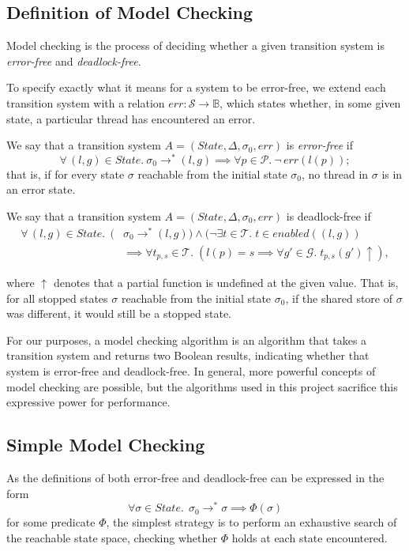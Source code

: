 \documentclass[12pt,a4paper,twoside,openright]{report}
\begin{document}
\subsection{Definition of Model Checking}
Model checking is the process of deciding
whether a
given transition system is \emph{error-free} and
\emph{deadlock-free}.

To specify exactly what it means for a system to
be error-free, we extend each transition system
with a relation
$\textit{err} : \mathcal{S} \to \mathbb{B}$, which states
whether, in some given state, a particular
thread has encountered an error.

We say that a transition system
$A = (\textit{State}, \Delta, \sigma_0, \textit{err})$
is
\emph{error-free} if
\[
	\forall\, (l, g) \in \textit{State}. \ \sigma_0 \longrightarrow^* (l, g)
	\implies \forall p \in \mathcal{P}.\ \neg\,\textit{err}(l(p));
\]
that is, if for every state $\sigma$ reachable from the initial state
$\sigma_0$, no thread in $\sigma$ is in an error state.

We say that a transition system
$A = (\textit{State}, \Delta, \sigma_0, \textit{err})$
is deadlock-free if
\begin{align*}
	\forall\, (l, g) \in \textit{State}. \;\, (&\sigma_0
	 \longrightarrow^* (l, g))
	\wedge (\neg \exists t \in \mathcal{T}.\;
	t \in \textit{enabled}((l, g)) \\
	&\implies \forall t_{p,s} \in \mathcal{T}.\;
	(l(p) = s \implies \forall g' \in \mathcal{G}. \;
		t_{p,s}(g')\!\uparrow),
\end{align*}

where $\uparrow$ denotes that a partial function is
undefined at the given value.
That is, for all stopped states $\sigma$ reachable from
the initial state $\sigma_0$, if the shared store of
$\sigma$ was different, it would still be a stopped state.

For our purposes, a model checking algorithm is an
algorithm that takes a transition system and returns
two Boolean results, indicating whether that system
is error-free and deadlock-free. In general, more
powerful concepts of model checking are possible,
but the algorithms used in this project sacrifice
this expressive power for performance.

\subsection{Simple Model Checking} \label{sec:simple-model-checking}
As the definitions of both error-free and deadlock-free
can be expressed in the form
\[
	\forall \sigma \in \textit{State}.\;\, \sigma_0 \longrightarrow^* \sigma
	\implies \Phi (\sigma)
\]
for some predicate $\Phi$, the simplest strategy is to
perform an exhaustive search of the reachable state space,
checking whether $\Phi$ holds at each state encountered.
\end{document}
